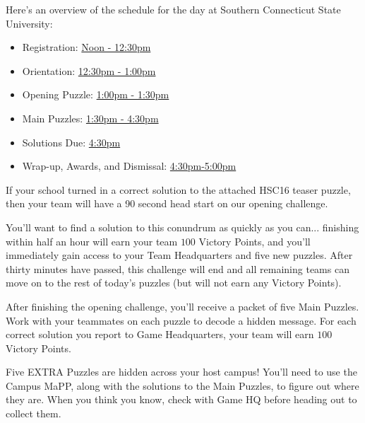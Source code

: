 
\begin{rules}


Here's an overview of the schedule for the day at
Southern Connecticut State University:

\begin{itemize}
\item Registration: \underline{Noon - 12:30pm}
\item Orientation: \underline{12:30pm - 1:00pm}
\item Opening Puzzle: \underline{1:00pm - 1:30pm}
\item Main Puzzles: \underline{1:30pm - 4:30pm}
\item Solutions Due: \underline{4:30pm}
\item Wrap-up, Awards, and Dismissal: \underline{4:30pm-5:00pm}
\end{itemize}

\vfill


If your school turned in a correct solution to the attached HSC16 teaser
puzzle, then your team will have a 90 second head start on our opening
challenge.

You'll want to find a solution to this conundrum as quickly as you can...
finishing within half an hour will earn your team
\(100\) Victory Points, and you'll immediately gain access to your Team Headquarters
and five new puzzles. After thirty minutes have passed, this challenge will end
and all remaining teams can move on to the rest of today's puzzles (but
will not earn any Victory Points).

\vfill


After finishing the opening challenge, you'll receive a packet of
five Main Puzzles. Work
with your teammates on each puzzle to decode a hidden message. For each
correct solution you report to Game Headquarters, your team will earn \(100\)
Victory Points.

\vfill

\newpage


Five EXTRA Puzzles are hidden across your host campus! You'll need to
use the Campus MaPP, along with the solutions to the Main Puzzles, to
figure out where they are. When you think you know, check with Game HQ before
heading out to collect them.


\end{rules}
